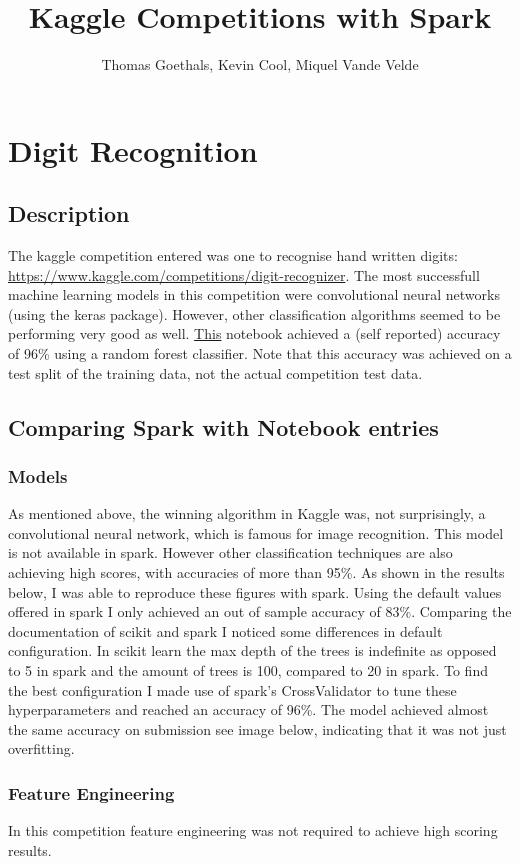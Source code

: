 \documentclass{article}
\title{Kaggle Competitions with Spark}
\author{Thomas Goethals, Kevin Cool, Miquel Vande Velde}
\begin{document}
	\maketitle
	\section{Digit Recognition}
	\subsection{Description}
		The kaggle competition entered was one to recognise hand written digits: \url{https://www.kaggle.com/competitions/digit-recognizer}. The most successfull machine learning models in this competition were convolutional neural networks (using the keras package). However, other classification algorithms seemed to be performing very good as well. \href{https://www.kaggle.com/code/alphaghostusmc/mnist-randomforest}{This} notebook achieved a (self reported) accuracy of 96\% using a random forest classifier. Note that this accuracy was achieved on a test split of the training data, not the actual competition test data.
	\subsection{Comparing Spark with Notebook entries}
	\subsubsection{Models}
	As mentioned above, the winning algorithm in Kaggle was, not surprisingly, a convolutional neural network, which is famous for image recognition. This model is not available in spark. However other classification techniques are also achieving high scores, with accuracies of more than 95\%. 
	As shown in the results below, I was able to reproduce these figures with spark.
	Using the default values offered in spark I only achieved an out of sample accuracy of 83\%. Comparing the documentation of scikit and spark I noticed some differences in default configuration. In scikit learn the max depth of the trees is indefinite as opposed to 5 in spark and the amount of trees is 100, compared to 20 in spark. To find the best configuration I made use of spark's CrossValidator to tune these hyperparameters and reached an accuracy of 96\%. The model achieved almost the same accuracy on submission see image below, indicating that it was not just overfitting.
	\subsubsection{Feature Engineering}
	In this competition feature engineering was not required to achieve high scoring results.
	
\end{document}
